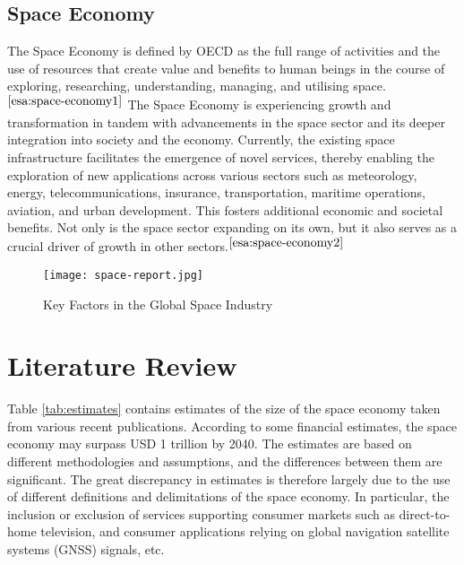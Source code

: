 \documentclass[12pt]{article}
\begin{document}
\subsection{Space Economy}
The Space Economy is defined by OECD as the full range of activities and the
use of resources that create value and benefits to human beings in the course
of exploring, researching, understanding, managing, and utilising
space.$^{\cite{esa:space-economy1}}$ The Space Economy is experiencing growth
and transformation in tandem with advancements in the space sector and its
deeper integration into society and the economy. Currently, the existing space
infrastructure facilitates the emergence of novel services, thereby enabling
the exploration of new applications across various sectors such as meteorology,
energy, telecommunications, insurance, transportation, maritime operations,
aviation, and urban development. This fosters additional economic and societal
benefits. Not only is the space sector expanding on its own, but it also serves
as a crucial driver of growth in other sectors.$^{\cite{esa:space-economy2}}$

\begin{figure}[ht]
    \centering
    \texttt{[image: space-report.jpg]}
    \caption{Key Factors in the Global Space Industry}
\end{figure}

\section{Literature Review}
Table \ref{tab:estimates} contains estimates of the size of the space economy taken from various recent publications. According to some financial estimates, the space economy may surpass USD 1 trillion by 2040. The estimates are based on different methodologies and assumptions, and the differences between them are significant. The great discrepancy in estimates is therefore largely due to the use of different definitions and delimitations of the space economy. In particular, the inclusion or exclusion of services supporting
consumer markets such as direct-to-home television, and consumer applications relying on global navigation satellite systems (GNSS) signals, etc.
\end{document}
